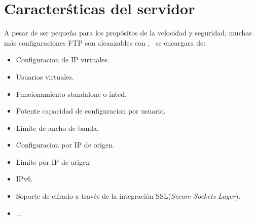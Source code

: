 \section{Caracter\'sticas del servidor}

  A pesar de ser peque\~na para los prop\'ositos de la velocidad y seguridad, muchas m\'as 
  configuraciones FTP son alcanzables con \vsftpd, \vsftpd\ se encargara de:
  \begin{itemize}
    \item Configuracion de IP virtuales.
    \item Usuarios virtuales.
    \item Funcionamiento standalone o inted.
    \item Potente capacidad de configuracion por usuario.
    \item Limite de ancho de banda.
    \item Configuracion por IP de origen.
    \item Limite por IP de origen
    \item IPv6.
    \item Soporte de cifrado a través de la integración SSL({\em Secure Sockets Layer}).
    \item ...
  \end{itemize}
  
